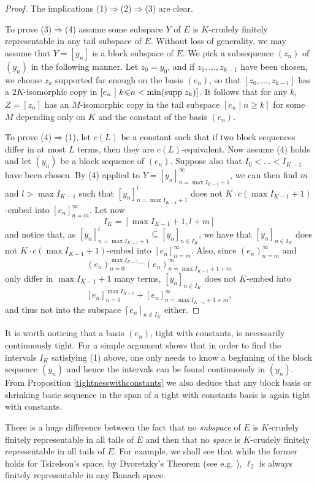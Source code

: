 \documentclass[10pt]{amsart}
\numberwithin{equation}{section}
\begin{document}
\begin{proof} The implications (1)${\Rightarrow}$(2)${\Rightarrow}$(3)  are clear.

To prove (3)${\Rightarrow}$(4) assume some subspace $Y$ of $E$ is $K$-crudely finitely
representable in any tail subspace of $E$. Without loss of generality, we may
assume that $Y=[y_n]$ is a block subspace of $E$. We pick a subsequence $(z_n)$
of $(y_n)$ in the following manner. Let $z_0=y_0$, and if $z_0,\ldots,z_{k-1}$
have been chosen, we choose $z_k$ supported far enough on the basis $(e_n)$, so
that $[z_0,\ldots,z_{k-1}]$ has a $2K$-isomorphic copy in  $[e_n { \; \big| \;} k {\ensuremath{\leqslant}} n
<\min({\rm supp }\; z_k)]$. It follows that for any $k$, $Z=[z_n]$ has an
$M$-isomorphic copy in the tail subspace $[e_n { \; \big| \;} n {\ensuremath{\geqslant}} k]$ for some $M$
depending only on $K$ and the constant of the basis $(e_n)$.

To prove (4)${\Rightarrow}$(1), let $c(L)$ be a constant such that if two block
sequences differ in at most $L$ terms, then they are $c(L)$-equivalent. Now
assume (4) holds and let $(y_n)$ be a block sequence of $(e_n)$. Suppose also
that $I_0<\ldots<I_{K-1}$ have been  chosen. By (4) applied to $Y=[y_n]_{n=\max
I_{K-1}+1}^\infty$, we can then find $m$ and $l>\max I_{K-1}$ such that
$[y_n]_{n=\max I_{K-1}+1}^l$ does not $K\cdot c(\max I_{K-1}+1)$-embed into
$[e_n]_{n=m}^\infty$.  Let now
$$
I_K=[\max I_{K-1}+1,l+m]
$$
and notice that, as $[y_n]_{n=\max I_{K-1}+1}^l\subseteq [y_n]_{n\in I_K}$, we
have that $ [y_n]_{n\in I_K}$ does not $K\cdot c(\max I_{K-1}+1)$-embed into
$[e_n]_{n=m}^\infty$. Also, since $(e_n)_{n=m}^\infty$ and
$$
(e_n)_{n=0}^{\max I_{K-1}}{}^\frown(e_n)_{n=\max I_{K-1}+1+m}^\infty
$$
only differ in $\max I_{K-1}+1$ many terms, $[y_n]_{n\in I_K}$ does not $K$-embed into
$$
[e_n]_{n=0}^{\max I_{K-1}}+[e_n]_{n=\max I_{K-1}+1+m}^\infty,
$$
and thus not into the subspace $[e_n]_{n\notin I_K}$ either.
\end{proof}
It is worth noticing that a basis $(e_n)$, tight with constants, is necessarily
continuously tight. For a simple argument shows that in order to find the
intervals $I_K$ satisfying (1) above, one only needs to know a beginning of the
block sequence $(y_n)$ and hence the intervals can be found continuously in
$(y_n)$. From Proposition \ref{tightnesswithconstants} we also deduce that any
block basis or shrinking basic sequence in the span of a tight with constants
basis is again tight with constants.

There is a huge difference between the fact that no {\em subspace} of $E$ is
$K$-crudely finitely representable in all tails of $E$ and then that no {\em space}
is $K$-crudely finitely representable in all tails of $E$. For example, we
shall see that while the former holds for Tsirelson's space, by Dvoretzky's
Theorem (see e.g. \cite{FLM}), $\ell_2$ is always finitely representable in any Banach space.
\end{document}
